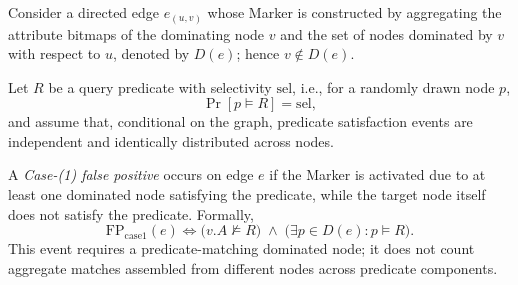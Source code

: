 


\begin{definition}
\label{def:case1-fpr}
Consider a directed edge $e_{(u,v)}$ whose Marker is constructed by aggregating the attribute bitmaps of the dominating node $v$ and the set of nodes dominated by $v$ with respect to $u$, denoted by $D(e)$; hence $v \notin D(e)$.

Let $R$ be a query predicate with selectivity $\mathrm{sel}$, i.e., for a randomly drawn node $p$,
\[
\Pr[p \models R] = \mathrm{sel},
\]
and assume that, conditional on the graph, predicate satisfaction events are
independent and identically distributed across nodes.

A \emph{Case-(1) false positive} occurs on edge $e$ if the Marker is activated due to at least one dominated node satisfying the predicate, while the target node itself does not satisfy the predicate. Formally,
\[
\mathrm{FP}_{\mathrm{case1}}(e)
\iff
\big(v.A \not\models R\big)
\;\wedge\;
\Big(\exists p \in D(e): p \models R\Big).
\]
This event requires a predicate-matching dominated node; it does not count
aggregate matches assembled from different nodes across predicate components.
\end{definition}

